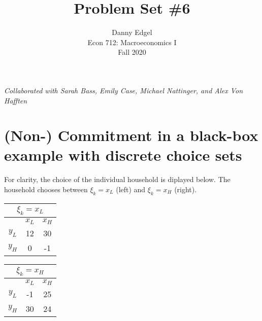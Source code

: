 \documentclass{article}
\begin{document}
\title{	Problem Set \#6 }
\author{ 	Danny Edgel 					\\ 
			Econ 712: Macroeconomics I		\\
			Fall 2020						\\
		}
\maketitle\thispagestyle{empty}


\noindent\textit{Collaborated with Sarah Bass, Emily Case, Michael Nattinger, and Alex Von Hafften}



\section{(Non-) Commitment in a black-box example with discrete choice sets}
For clarity, the choice of the individual household is diplayed below. The household chooses between $\xi_k=x_L$ (left) and $\xi_k=x_H$ (right).
\begin{center}
	\begin{tabular}{|c|c|c|}
		\multicolumn{3}{c}{$\xi_k=x_L$}	\\ \hline
				& $x_L$ & $x_H$ \\ \hline 
		$y_L$	& 12 & 30 		\\ \hline
		$y_H$	& 0  & -1 		\\ \hline
	\end{tabular} \quad
	\begin{tabular}{|c|c|c|}
		\multicolumn{3}{c}{$\xi_k=x_H$}	\\ \hline
				& $x_L$ & $x_H$ \\ \hline 
		$y_L$	& -1 & 25 		\\ \hline
		$y_H$	& 30 & 24 		\\ \hline
	\end{tabular}
\end{center}
\end{document}
